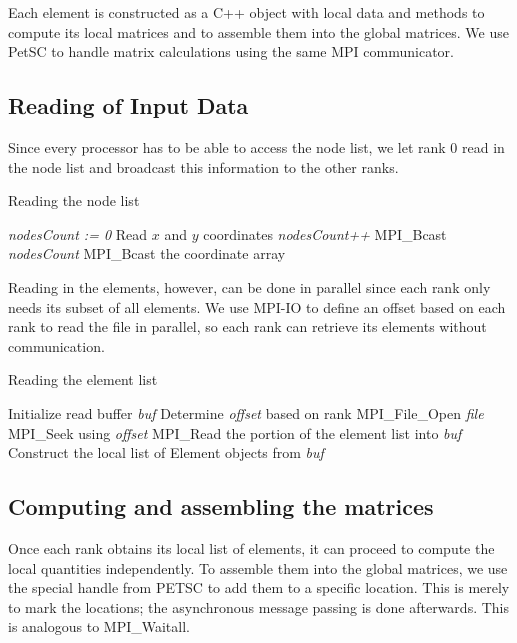 \documentclass[12pt]{extreport}
\begin{document}
Each element is constructed as a C++ object with local data and methods to compute its local matrices and to assemble them into the global matrices. We use PetSC to handle matrix calculations using the same MPI communicator.

\subsection*{Reading of Input Data}
Since every processor has to be able to access the node list, we let rank 0 read in the node list and broadcast this information to the other ranks.
\begin{algorithm}
  \caption{Reading the node list}
  \begin{algorithmic}
     
    \State \textit{nodesCount := 0}
    \State Read $x$ and $y$ coordinates
    \State \textit{nodesCount++}
    \EndFor
    \EndIf
    \State MPI\_Bcast \textit{nodesCount}
    \State MPI\_Bcast the coordinate array
    \EndProcedure
  \end{algorithmic}
\end{algorithm}

Reading in the elements, however, can be done in parallel since each rank only needs its subset of all elements. We use MPI-IO to define an offset based on each rank to read the file in parallel, so each rank can retrieve its elements without communication.
\begin{algorithm}
  \caption{Reading the element list}
  \begin{algorithmic}
    \State Initialize read buffer \textit{buf}
    \State Determine \textit{offset} based on rank
    \State MPI\_File\_Open \textit{file}
    \State MPI\_Seek using \textit{offset}
    \State MPI\_Read the portion of the element list into \textit{buf}
    \State Construct the local list of Element objects from \textit{buf}
    \EndProcedure
  \end{algorithmic}
\end{algorithm}

\subsection*{Computing and assembling the matrices}
Once each rank obtains its local list of elements, it can proceed to compute the local quantities independently. To assemble them into the global matrices, we use the special handle from PETSC to add them to a specific location. This is merely to mark the locations; the asynchronous message passing is done afterwards. This is analogous to MPI\_Waitall.
\end{document}
